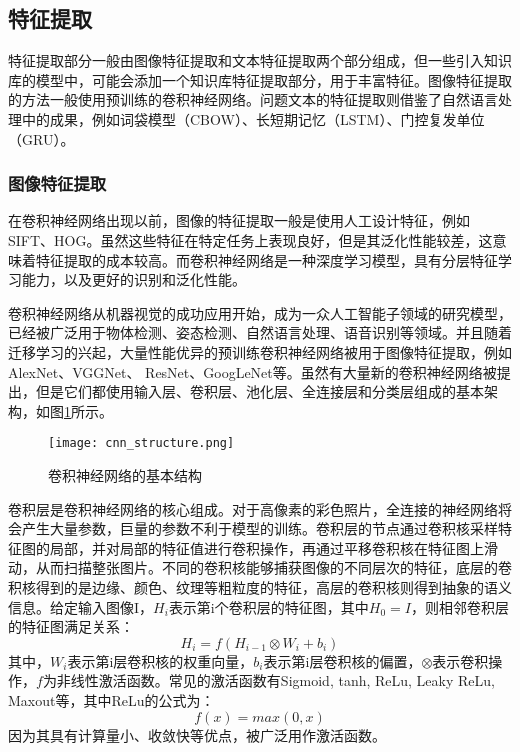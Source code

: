 
\subsection{特征提取}
特征提取部分一般由图像特征提取和文本特征提取两个部分组成，但一些引入知识库的模型中，可能会添加一个知识库特征提取部分，用于丰富特征。图像特征提取的方法一般使用预训练的卷积神经网络。问题文本的特征提取则借鉴了自然语言处理中的成果，例如词袋模型（CBOW）、长短期记忆（LSTM）、门控复发单位（GRU）。

\subsubsection{图像特征提取}
在卷积神经网络出现以前，图像的特征提取一般是使用人工设计特征，例如SIFT、HOG。虽然这些特征在特定任务上表现良好，但是其泛化性能较差，这意味着特征提取的成本较高。而卷积神经网络是一种深度学习模型，具有分层特征学习能力，以及更好的识别和泛化性能。

卷积神经网络从机器视觉的成功应用开始，成为一众人工智能子领域的研究模型，已经被广泛用于物体检测、姿态检测、自然语言处理、语音识别等领域。并且随着迁移学习的兴起，大量性能优异的预训练卷积神经网络被用于图像特征提取，例如AlexNet、VGGNet、 ResNet、GoogLeNet等。虽然有大量新的卷积神经网络被提出，但是它们都使用输入层、卷积层、池化层、全连接层和分类层组成的基本架构，如图\ref{cnn_structure}所示。
\begin{figure}[H]
	\centering
	\texttt{[image: cnn\_structure.png]}
	\caption{卷积神经网络的基本结构}
	\label{cnn_structure}
\end{figure}

卷积层是卷积神经网络的核心组成。对于高像素的彩色照片，全连接的神经网络将会产生大量参数，巨量的参数不利于模型的训练。卷积层的节点通过卷积核采样特征图的局部，并对局部的特征值进行卷积操作，再通过平移卷积核在特征图上滑动，从而扫描整张图片。不同的卷积核能够捕获图像的不同层次的特征，底层的卷积核得到的是边缘、颜色、纹理等粗粒度的特征，高层的卷积核则得到抽象的语义信息。给定输入图像I，$H_i$表示第i个卷积层的特征图，其中$H_0=I$，则相邻卷积层的特征图满足关系：
\begin{equation}
H_i = f(H_{i-1}\otimes W_i + b_i)
\end{equation}
其中，$W_i$表示第i层卷积核的权重向量，$b_i$表示第i层卷积核的偏置，$\otimes$表示卷积操作，$f$为非线性激活函数。常见的激活函数有Sigmoid, tanh, ReLu, Leaky ReLu, Maxout等，其中ReLu的公式为：
\begin{equation}
f(x) = max(0,x)
\end{equation}
因为其具有计算量小、收敛快等优点，被广泛用作激活函数。

